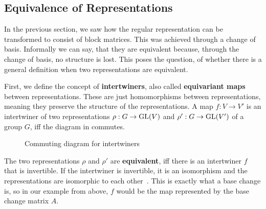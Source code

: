 \subsection{Equivalence of Representations}

In the previous section, we saw how the regular representation can be transformed to consist of block matrices.
This was achieved through a change of basis.
Informally we can say, that they are equivalent because, through the change of basis, no structure is lost.
This poses the question, of whether there is a general definition when two representations are equivalent.

First, we define the concept of \textbf{intertwiners}, also called \textbf{equivariant maps} between representations.
These are just homomorphisms between representations, meaning they preserve the structure of the representations.
A map $f: V \to V'$ is an intertwiner of two representations $\rho: G \to \operatorname{GL}(V)$ and $\rho': G \to \operatorname{GL}(V')$ of a group $G$, iff the diagram in  commutes\cite{fuchs2003}.

\begin{figure}[h]
    \centering
    \caption{Commuting diagram for intertwiners}
    \label{fig:main.what.equ-cd}
\end{figure}

The two representations $\rho$ and $\rho'$ are \textbf{equivalent}, iff there is an intertwiner $f$ that is invertible.
If the intertwiner is invertible, it is an isomorphism and the representations are isomorphic to each other~\cite{hein2013,fuchs2003}.
This is exactly what a base change is, so in our example from above, $f$ would be the map represented by the base change matrix $A$.
